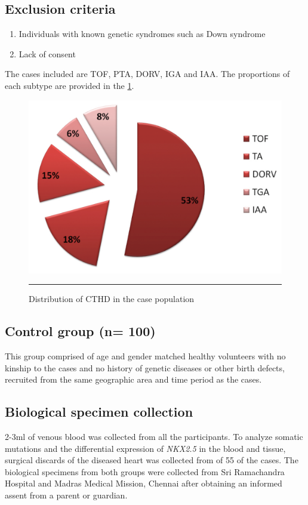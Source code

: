 \subsection{Exclusion criteria}
\begin{enumerate}
\item Individuals with known genetic syndromes such as Down syndrome
\item Lack of consent
\end{enumerate}
	
The cases included are TOF, PTA, DORV, IGA and IAA.  The proportions of each subtype are provided in the \cref{fig:2_1casepopln}.

\begin{figure}[!b]
\centering
\includegraphics[width=\linewidth]{Figures/2_1casepopln.pdf} 
\rule{35em}{0.5pt}
\caption{Distribution of CTHD in the case population}
\label{fig:2_1casepopln}
\end{figure}

\subsection{Control group (n= 100)}
This group comprised of age and gender matched healthy volunteers with no kinship to the cases and no history of genetic diseases or other birth defects, recruited from the same geographic area and time period as the cases. 


\subsection{Biological specimen collection}
2-3ml of venous blood was collected from all the participants. To analyze somatic mutations and the differential expression of \textit{NKX2.5} in the blood and tissue, surgical discards of the diseased heart was collected from of 55 of the cases. The biological specimens from both groups were collected from Sri Ramachandra Hospital and Madras Medical Mission, Chennai after obtaining an informed assent from a parent or guardian. 

